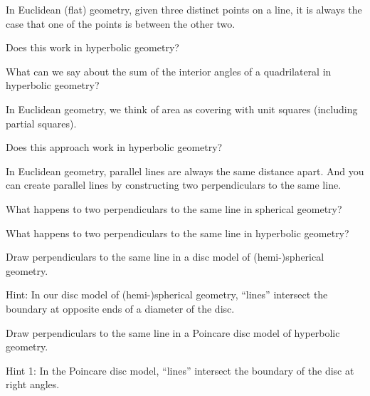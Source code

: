 \documentclass{ximera}
\begin{document}
\begin{question}
In Euclidean (flat) geometry, given three distinct points on a line, it is always
the case that one of the points is between the other two.

Does this work in hyperbolic geometry?
\end{question}


\begin{question}
What can we say about the sum of the interior angles of a quadrilateral in hyperbolic geometry?
\end{question}

\begin{question}
In Euclidean geometry, we think of area as covering with unit squares (including partial squares).

Does this approach work in hyperbolic geometry?
\end{question}

\begin{question}
In Euclidean geometry, parallel lines are always the same distance apart. 
And you can create parallel lines by constructing two perpendiculars to the same line.

What happens to two perpendiculars to the same line in spherical geometry?
\end{question}

\begin{question}
What happens to two perpendiculars to the same line in hyperbolic geometry?
\end{question}

\begin{question}
Draw perpendiculars to the same line in a disc model of (hemi-)spherical geometry.

Hint: In our disc model of (hemi-)spherical geometry, ``lines'' intersect the
boundary at opposite ends of a diameter of the disc.
\end{question}

\begin{question}
Draw perpendiculars to the same line in a Poincare disc model of hyperbolic geometry.

Hint 1: In the Poincare disc model, ``lines'' intersect the boundary of the disc at right angles.
\end{question}
\end{document}
